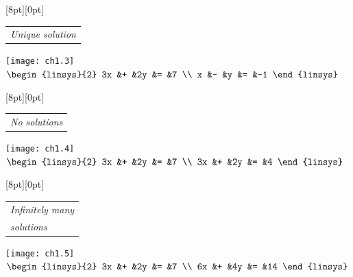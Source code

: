 \begin{center}
  \begin{minipage}[b]{1.45in}
    \raisebox{-2pt}[8pt][0pt]{\small \begin{tabular}{@{}l}
      \small \textit{Unique solution}
    \end{tabular}}
    \begin{center}
      \texttt{[image: ch1.3]} \\[.75ex]
      \small $\begin{linsys}{2}
                         3x  &+  &2y  &=  &7   \\
                         x   &-  &y   &=  &-1
                       \end{linsys}$
    \end{center}
  \end{minipage}
  \hspace*{0em}
  \begin{minipage}[b]{1.45in}
    \raisebox{-2pt}[8pt][0pt]{\small \begin{tabular}{@{}l}
      \small \textit{No solutions}
    \end{tabular}}
    \begin{center}
      \texttt{[image: ch1.4]} \\[.75ex]
      \small $\begin{linsys}{2}
                         3x  &+  &2y  &=  &7   \\
                         3x  &+  &2y  &=  &4
                       \end{linsys}$
    \end{center}
  \end{minipage}
  \hspace*{0em}
  \begin{minipage}[b]{1.45in}
    \raisebox{-2pt}[8pt][0pt]{\small \begin{tabular}[t]{@{}l}
      \textit{Infinitely many} \\
      \textit{solutions}
    \end{tabular}}
    \begin{center}
      \texttt{[image: ch1.5]}         \\[.75ex]
      \small $ \begin{linsys}{2}
                         3x  &+  &2y  &=  &7   \\
                         6x  &+  &4y  &=  &14
                       \end{linsys}$
    \end{center}
  \end{minipage}
\end{center}
